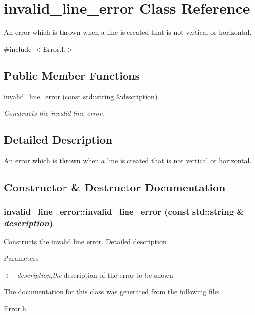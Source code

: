 \hypertarget{classinvalid__line__error}{
\section{invalid\_\-line\_\-error Class Reference}
\label{classinvalid__line__error}
}


An error which is thrown when a line is created that is not vertical or horizontal.  


{\ttfamily \#include $<$Error.h$>$}\subsection*{Public Member Functions}
\begin{DoxyCompactItemize}
\item 
\hyperlink{classinvalid__line__error_a84f770a398492180ab7a65d6ff5776c0}{invalid\_\-line\_\-error} (const std::string \&description)
\begin{DoxyCompactList}\small\item\em Constructs the invalid line error. \item\end{DoxyCompactList}\end{DoxyCompactItemize}


\subsection{Detailed Description}
An error which is thrown when a line is created that is not vertical or horizontal. 

\subsection{Constructor \& Destructor Documentation}
\hypertarget{classinvalid__line__error_a84f770a398492180ab7a65d6ff5776c0}{
\subsubsection[{invalid\_\-line\_\-error}]{\setlength{\rightskip}{0pt plus 5cm}invalid\_\-line\_\-error::invalid\_\-line\_\-error (const std::string \& {\em description})}}
\label{classinvalid__line__error_a84f770a398492180ab7a65d6ff5776c0}


Constructs the invalid line error. Detailed description 
\begin{DoxyParams}{Parameters}
\item[\mbox{$\leftarrow$} {\em description,the}]description of the error to be shown \end{DoxyParams}


The documentation for this class was generated from the following file:\begin{DoxyCompactItemize}
\item 
Error.h\end{DoxyCompactItemize}
